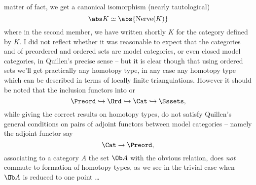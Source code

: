 matter of fact, we get a canonical isomorphism (nearly tautological)
\[ \abs K \simeq \abs{\text{Nerve}(K)} \]
where in the second member, we have written shortly $K$ for the
category defined by $K$. I did not reflect whether it was reasonable
to expect that the categories \Preord{} and \Ord{} of preordered and
ordered sets are model categories, or even closed model categories, in
Quillen's precise sense -- but it is clear though that using ordered
sets we'll get practically any homotopy type, in any case any homotopy
type which can be described in terms of locally finite
triangulations. However it should be noted that the inclusion functors
into \Cat{} or \Sssets
\[ \Preord \hookrightarrow \Ord \hookrightarrow
\Cat \hookrightarrow \Sssets,\]
while giving the correct results on homotopy types, do not satisfy
Quillen's general conditions on pairs of adjoint functors between
model categories -- namely the adjoint functor say
\[ \Cat \to \Preord, \]
associating to a category $A$ the set $\Ob A$ with the obvious
relation, does \emph{not} commute to formation of homotopy types, as
we see in the trivial case when $\Ob A$ is reduced to one point \ldots

